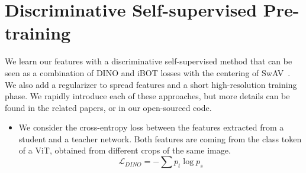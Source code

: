 \section{Discriminative Self-supervised Pre-training}
\label{sec:approach}
We learn our features with a discriminative self-supervised method that can be seen as a combination of DINO and iBOT losses with the centering of SwAV~\citep{caron2020unsupervised}.
We also add a regularizer to spread features and a short high-resolution training phase.
We rapidly introduce each of these approaches, but more details can be found in the related papers, or in our open-sourced code. 

\begin{itemize}
\item
We consider the cross-entropy loss between the features extracted from a student and a teacher network.
Both features are coming from the class token of a ViT, obtained from different crops of the same image.
$${\mathcal L}_{DINO} = - \sum p_t \log p_s$$


\end{itemize}
